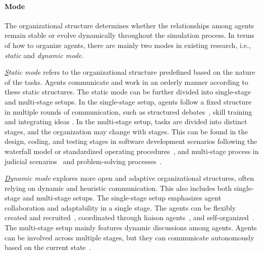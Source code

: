 \paragraph{Mode}
The organizational structure determines whether the relationships among agents remain stable or evolve dynamically throughout the simulation process. In terms of how to organize agents, there are mainly two modes in existing research, i.e., \textit{static} and \textit{dynamic mode}.

\textit{{\ul Static mode}} refers to the organizational structure predefined based on the nature of the tasks. Agents communicate and work in an orderly manner according to these static structures. The static mode can be further divided into single-stage and multi-stage setups. In the single-stage setup, agents follow a fixed structure in multiple rounds of communication, such as structured debates~\cite{nair2023dera,li2023camel,fu2023improving,chan2023chateval}, skill training~\cite{yang2024social,yan2024social} and integrating ideas \cite{hamilton2023blind,hao2023chatllm}. In the multi-stage setup, tasks are divided into distinct stages, and the organization may change with stages. This can be found in the design, coding, and testing stages in software development scenarios following the waterfall model or standardized operating procedures~\cite{qian2024chatdev,hong2023metagpt}, and multi-stage process in judicial scenarios~\cite{he2024simucourt,baker2024simulating} and problem-solving processes~\cite{zhu2023ghost,zhang2023building,ma2024debate}.

\textit{{\ul Dynamic mode}} explores more open and adaptive organizational structures, often relying on dynamic and heuristic communication. This also includes both single-stage and multi-stage setups.  The single-stage setup emphasizes agent collaboration and adaptability in a single stage. The agents can be flexibly created and recruited~\cite{xie2023openagents,chen2023autoagents,ma2024debate,chen2023agentverse,liu2024autonomous}, coordinated through liaison agents~\cite{jin2024if,li2024culturepark}, and self-organized~\cite{chen2024s}. The multi-stage setup mainly features dynamic discussions among agents. Agents can be involved across multiple stages, but they can communicate autonomously based on the current state~\cite{dong2023self,zheng2023chatgpt,tang2023medagents,sun2024lawluo,yu2024mooc}.

